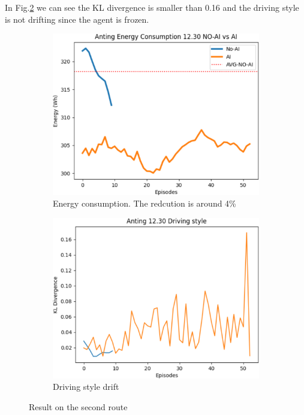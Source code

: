 \documentclass{article}
\begin{document}
In Fig.\@\ref{fig:openroad b style} we can see the KL divergence is smaller than 0.16 and the driving style is not drifting since the agent is frozen.

\begin{figure}[htbp]
	\centering
	\begin{subfigure}[t]{0.4\textwidth}
		\centering
		\includegraphics[width=\textwidth]{images/openroad_b_consumption.png}
		\caption{Energy consumption. The redcution is around 4\%}\label{fig:openroad b consumption}
	\end{subfigure}
	\hfill
	\begin{subfigure}[t]{0.4\textwidth}
		\centering
		\includegraphics[width=\textwidth]{images/openroad_b_style.png}
		\caption{Driving style drift}\label{fig:openroad b style}
	\end{subfigure}
	\caption{Result on the second route\label{fig:openroad b result}}
\end{figure}
\end{document}
